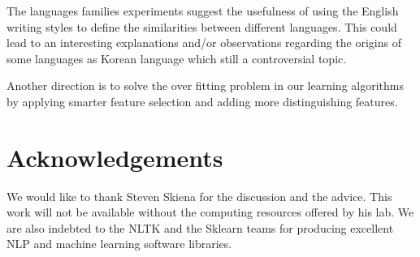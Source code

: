 \documentclass[11pt]{article}
\begin{document}
The languages families experiments suggest the usefulness of using the English writing styles to define the similarities between different languages. This could lead to an interesting explanations and/or observations regarding the origins of some languages as Korean language which still a controversial topic.

Another direction is to solve the over fitting problem in our learning algorithms by applying smarter feature selection and adding more distinguishing features.

\section*{Acknowledgements}
We would like to thank Steven Skiena for the discussion and the advice. This
work will not be available without the computing resources offered by his lab.
We are also indebted to the NLTK and the Sklearn teams for producing excellent
NLP and machine learning software libraries.

{}

\end{document}
